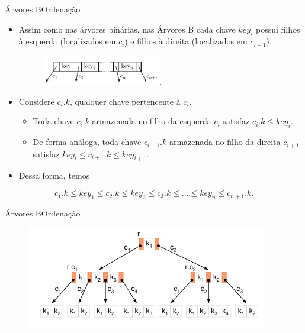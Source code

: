 \documentclass[aspectratio=169]{beamer}
\begin{document}

\begin{frame}{Árvores B}{Ordenação}
\begin{itemize}
\item Assim como nas árvores binárias, nas Árvores B cada chave $key_i$ possui filhos à esquerda (localizados em $c_i$) e filhos à direita (localizados em $c_{i+1}$).
\begin{figure}[!h]
  \centering
   \includegraphics[width=150pt]{imagens/estrutura_nodo.png}
  \label{fig_estrutura_nodo1}
\end{figure} 
\item Considere $c_i.k$, qualquer chave pertencente à $c_i$.
\begin{itemize}
\item Toda chave $c_i.k$  armazenada no filho da esquerda $c_i$ satisfaz $c_i.k \leq key_i$.
\item De forma análoga, toda chave $c_{i+1}.k$ armazenada no filho da direita $c_{i+1}$ satisfaz $key_i \leq c_{i+1}.k \leq key_{i+1}$.
\end{itemize}
\item Dessa forma, temos
\end{itemize}
\begin{equation}
 c_1.k \leq key_1 \leq c_2.k \leq key_2 \leq c_3.k \leq ... \leq key_n \leq c_{n+1}.k. \nonumber 
\end{equation}
\end{frame}


\begin{frame}{Árvores B}{Ordenação}
\begin{figure}[!h]
\centering
   \includegraphics[width=300pt]{imagens/exemplo2-arvore-b.png}
  \label{fig_exemplo2-arvore-b}
\end{figure} 
\end{frame}
\end{document}

